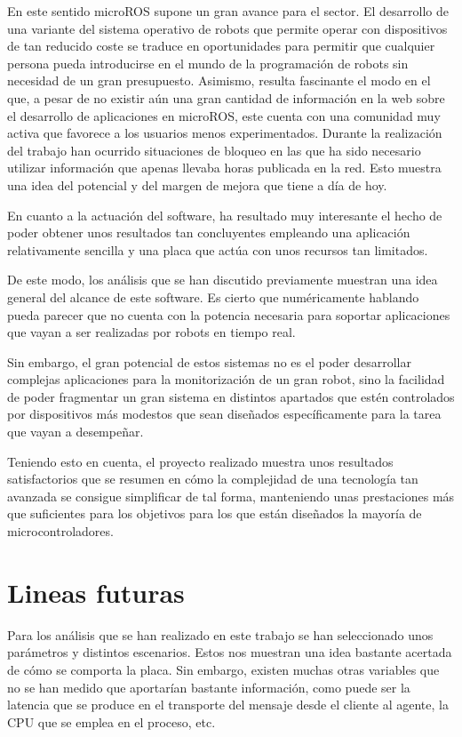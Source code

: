 \documentclass[a4paper,11pt,spanish]{sphinxmanual}
\begin{document}
\sphinxAtStartPar
En este sentido micro\sphinxhyphen{}ROS supone un gran avance para el sector. El desarrollo
de una variante del sistema operativo de robots que permite operar con dispositivos
de tan reducido coste se traduce en oportunidades para permitir que cualquier
persona pueda introducirse en el mundo de la programación de robots sin
necesidad de un gran presupuesto. Asimismo, resulta fascinante el modo en el
que, a pesar de no existir aún una gran cantidad de información en la web sobre el
desarrollo de aplicaciones en micro\sphinxhyphen{}ROS, este cuenta con una comunidad muy activa
que favorece a los usuarios menos experimentados. Durante la realización del
trabajo han ocurrido situaciones de bloqueo en las que ha sido necesario
utilizar información que apenas llevaba horas publicada en la red. Esto muestra
una idea del potencial y del margen de mejora que tiene a día de hoy.

\sphinxAtStartPar
En cuanto a la actuación del software, ha resultado muy interesante el hecho
de poder obtener unos resultados tan concluyentes empleando una aplicación
relativamente sencilla y una placa que actúa con unos recursos tan limitados.

\sphinxAtStartPar
De este modo, los análisis que se han discutido previamente muestran
una idea general del alcance de este software. Es cierto que numéricamente
hablando pueda parecer que no cuenta con la potencia necesaria para
soportar aplicaciones que vayan a ser realizadas por robots en tiempo real.

\sphinxAtStartPar
Sin embargo, el gran potencial de estos sistemas no es el poder desarrollar
complejas aplicaciones para la monitorización de un gran robot, sino la facilidad
de poder fragmentar un gran sistema en distintos apartados que estén
controlados por dispositivos más modestos que sean diseñados específicamente
para la tarea que vayan a desempeñar.

\sphinxAtStartPar
Teniendo esto en cuenta, el proyecto realizado muestra unos resultados satisfactorios
que se resumen en cómo la complejidad de una tecnología tan avanzada se consigue
simplificar de tal forma, manteniendo unas prestaciones más que suficientes
para los objetivos para los que están diseñados la mayoría de microcontroladores.


\section{Lineas futuras}
\label{\detokenize{conclusiones_y_lineas_futuras:lineas-futuras}}
\sphinxAtStartPar
Para los análisis que se han realizado en este trabajo se han seleccionado unos
parámetros y distintos escenarios. Estos nos muestran una idea bastante acertada
de cómo se comporta la placa. Sin embargo, existen muchas otras variables que no
se han medido que aportarían bastante información, como puede ser la latencia que
se produce en el transporte del mensaje desde el cliente al agente, la CPU que se
emplea en el proceso, etc.
\end{document}
